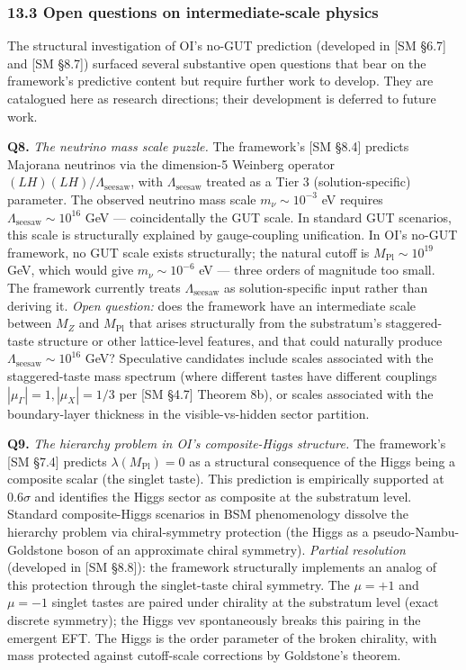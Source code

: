 \documentclass[
]{article}
\begin{document}
\hypertarget{open-questions-on-intermediate-scale-physics}{%
\subsubsection{13.3 Open questions on intermediate-scale
physics}\label{open-questions-on-intermediate-scale-physics}}

The structural investigation of OI's no-GUT prediction (developed in
{[}SM §6.7{]} and {[}SM §8.7{]}) surfaced several substantive open
questions that bear on the framework's predictive content but require
further work to develop. They are catalogued here as research
directions; their development is deferred to future work.

\textbf{Q8.} \emph{The neutrino mass scale puzzle.} The framework's
{[}SM §8.4{]} predicts Majorana neutrinos via the dimension-5 Weinberg
operator \((LH)(LH)/\Lambda_{\mathrm{seesaw}}\), with
\(\Lambda_{\mathrm{seesaw}}\) treated as a Tier 3 (solution-specific)
parameter. The observed neutrino mass scale \(m_\nu \sim 10^{-3}\) eV
requires \(\Lambda_{\mathrm{seesaw}} \sim 10^{16}\) GeV ---
coincidentally the GUT scale. In standard GUT scenarios, this scale is
structurally explained by gauge-coupling unification. In OI's no-GUT
framework, no GUT scale exists structurally; the natural cutoff is
\(M_{\mathrm{Pl}} \sim 10^{19}\) GeV, which would give
\(m_\nu \sim 10^{-6}\) eV --- three orders of magnitude too small. The
framework currently treats \(\Lambda_{\mathrm{seesaw}}\) as
solution-specific input rather than deriving it. \emph{Open question:}
does the framework have an intermediate scale between \(M_Z\) and
\(M_{\mathrm{Pl}}\) that arises structurally from the substratum's
staggered-taste structure or other lattice-level features, and that
could naturally produce \(\Lambda_{\mathrm{seesaw}} \sim 10^{16}\) GeV?
Speculative candidates include scales associated with the
staggered-taste mass spectrum (where different tastes have different
couplings \(|\mu_\Gamma| = 1, |\mu_X| = 1/3\) per {[}SM §4.7{]} Theorem
8b), or scales associated with the boundary-layer thickness in the
visible-vs-hidden sector partition.

\textbf{Q9.} \emph{The hierarchy problem in OI's composite-Higgs
structure.} The framework's {[}SM §7.4{]} predicts
\(\lambda(M_{\mathrm{Pl}}) = 0\) as a structural consequence of the
Higgs being a composite scalar (the singlet taste). This prediction is
empirically supported at \(0.6\sigma\) and identifies the Higgs sector
as composite at the substratum level. Standard composite-Higgs scenarios
in BSM phenomenology dissolve the hierarchy problem via chiral-symmetry
protection (the Higgs as a pseudo-Nambu-Goldstone boson of an
approximate chiral symmetry). \emph{Partial resolution} (developed in
{[}SM §8.8{]}): the framework structurally implements an analog of this
protection through the singlet-taste chiral symmetry. The \(\mu = +1\)
and \(\mu = -1\) singlet tastes are paired under chirality at the
substratum level (exact discrete symmetry); the Higgs vev spontaneously
breaks this pairing in the emergent EFT. The Higgs is the order
parameter of the broken chirality, with mass protected against
cutoff-scale corrections by Goldstone's theorem.
\end{document}
